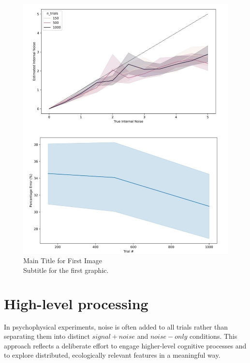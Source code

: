 \begin{figure}[ht!]
    \centering
    \includegraphics[width=14cm]{MainLayout/Images/chapter3/internal_noise.jpg}
    \caption{Main Title for First Image \\ \small Subtitle for the first graphic.}
    \label{fig:internal_noise}
\end{figure}
 
\section{High-level processing}


In psychophysical experiments, noise is often added to all trials rather than separating them into distinct $signal+noise$ and $noise-only$ conditions. This approach reflects a deliberate effort to engage higher-level cognitive processes and to explore distributed, ecologically relevant features in a meaningful way.

